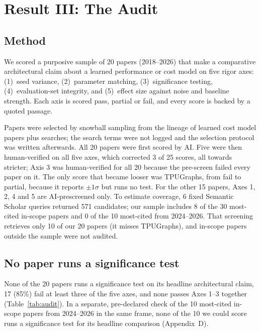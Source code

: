 \section{Result III: The Audit}
\label{sec:audit}

\subsection{Method}
\label{sec:audit-method}
We scored a purposive sample of 20 papers (2018--2026) that make a comparative architectural claim
about a learned performance or cost model on five rigor axes: (1)~seed variance, (2)~parameter
matching, (3)~significance testing, (4)~evaluation-set integrity, and (5)~effect size against noise and
baseline strength. Each axis is scored pass, partial or fail, and every score is backed by a quoted
passage.

Papers were selected by snowball sampling from the lineage of learned cost model papers plus searches;
the search terms were not logged and the selection protocol was written afterwards. All 20 papers were
first scored by AI. Five were then human-verified on all five axes, which corrected 3 of 25 scores, all
towards stricter; Axis 3 was human-verified for all 20 because the pre-screen failed every paper on it.
The only score that became looser was TPUGraphs, from fail to partial, because it reports $\pm1\sigma$
but runs no test. For the other 15 papers, Axes 1, 2, 4 and 5 are AI-prescreened only. To estimate
coverage, 6 fixed Semantic Scholar queries returned 571 candidates; our sample includes 8 of the 30
most-cited in-scope papers and 0 of the 10 most-cited from 2024--2026. That screening retrieves only 10
of our 20 papers (it misses TPUGraphs), and in-scope papers outside the sample were not audited.

\subsection{No paper runs a significance test}
\label{sec:audit-result}
None of the 20 papers runs a significance test on its headline architectural claim, 17 (85\%) fail at
least three of the five axes, and none passes Axes 1--3 together (Table~\ref{tab:audit}).
In a separate, pre-declared check of the 10 most-cited in-scope papers from 2024--2026 in the same
frame, none of the 10 we could score runs a significance test for its headline comparison
(Appendix~D).

